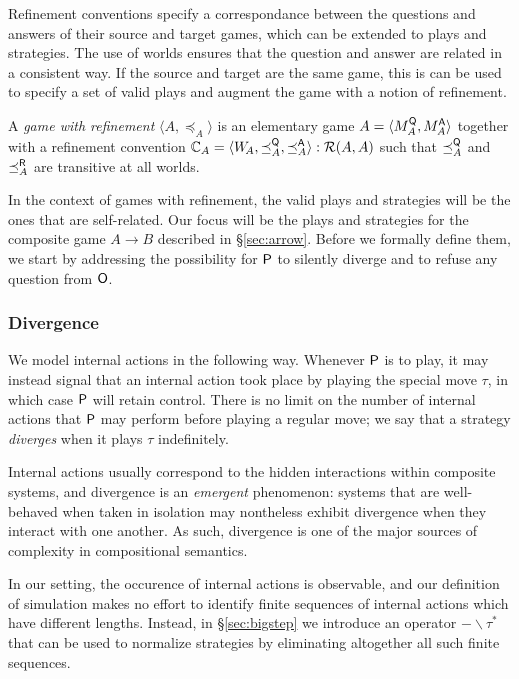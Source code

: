 Refinement conventions specify a correspondance
between the questions and answers of their source and target games,
which can be extended to plays and strategies.
The use of worlds ensures that the question and answer
are related in a consistent way.
If the source and target are the same game,
this is can be used to specify a set of valid plays
and augment the game with a notion of refinement.

\begin{definition} %
A \emph{game with refinement} $\langle A, \preceq_A \rangle$
is an elementary game
$A = \langle M_A^{ \mathsf{Q} }, M_A^{ \mathsf{A} } \rangle$
together with a refinement convention
$\mathbb{C}_A = \langle W_{\!A}, {\preceq}_A^{ \mathsf{Q} }, {\preceq}_A^{ \mathsf{A} } \rangle
  : \mathcal{R}(A, A)$
such that $\preceq_A^{ \mathsf{Q} }$ and $\preceq_A^{ \mathsf{R} }$
are transitive at all worlds.
\end{definition}

In the context of games with refinement,
the valid plays and strategies will be the ones
that are self-related.
Our focus will be the plays and strategies
for the composite game $A \rightarrow B$
described in \S\ref{sec:arrow}.
Before we formally define them,
we start by addressing
the possibility for $ \mathsf{P} $ to silently diverge
and to refuse any question from $ \mathsf{O} $.


\subsubsection{Divergence} %

We model internal actions in the following way.
Whenever $ \mathsf{P} $ is to play,
it may instead signal that an internal action took place
by playing the special move $\tau$,
in which case $ \mathsf{P} $ will retain control.
There is no limit on the number of internal actions that
$ \mathsf{P} $ may perform before playing a regular move;
we say that a strategy \emph{diverges}
when it plays $\tau$ indefinitely.

Internal actions usually correspond to the hidden interactions
within composite systems, and
divergence is an \emph{emergent} phenomenon:
systems that are well-behaved when taken in isolation
may nontheless exhibit divergence when they interact with one another.
As such,
divergence is one of the major sources of complexity
in compositional semantics.

In our setting,
the occurence of internal actions
is observable,
and our definition of simulation
makes no effort
to identify finite sequences of internal actions
which have different lengths.
Instead,
in \S\ref{sec:bigstep}
we introduce an operator $- \backslash \tau^*$
that can be used to normalize strategies
by eliminating altogether all such finite sequences.

